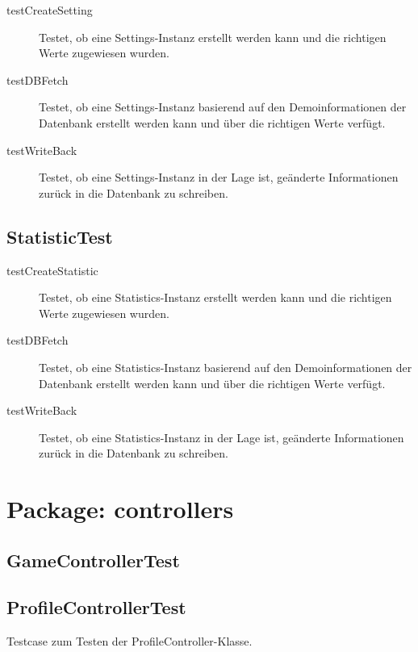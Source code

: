 \documentclass[parskip=full]{scrreprt}
\begin{document}
\begin{description}
	\item[testCreateSetting] Testet, ob eine Settings-Instanz erstellt werden kann und die richtigen Werte zugewiesen wurden.
	\item[testDBFetch] Testet, ob eine Settings-Instanz basierend auf den Demoinformationen der Datenbank erstellt werden kann und über die richtigen Werte verfügt.
	\item[testWriteBack] Testet, ob eine Settings-Instanz in der Lage ist, geänderte Informationen zurück in die Datenbank zu schreiben.
\end{description}

\subsection{StatisticTest}

\begin{description}
	\item[testCreateStatistic] Testet, ob eine Statistics-Instanz erstellt werden kann und die richtigen Werte zugewiesen wurden.
	\item[testDBFetch] Testet, ob eine Statistics-Instanz basierend auf den Demoinformationen der Datenbank erstellt werden kann und über die richtigen Werte verfügt.
	\item[testWriteBack] Testet, ob eine Statistics-Instanz in der Lage ist, geänderte Informationen zurück in die Datenbank zu schreiben.
\end{description}

\clearpage

\section{Package: controllers}

\subsection{GameControllerTest}

\begin{description}
	\item 
\end{description}

\subsection{ProfileControllerTest}

Testcase zum Testen der ProfileController-Klasse.
\end{document}
